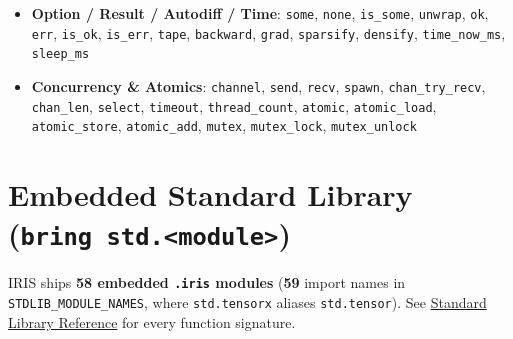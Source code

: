\documentclass[
  english,
  oneside]{book}
\newcounter{none} %
\begin{document}
\begin{itemize}
  \textbf{Collections}: \texttt{list}, \texttt{list\_get},
  \texttt{list\_set}, \texttt{list\_len}, \texttt{list\_push},
  \texttt{list\_pop}, \texttt{list\_map}, \texttt{list\_filter},
  \texttt{list\_reduce}, \texttt{list\_any}, \texttt{list\_all},
  \texttt{list\_zip}, \texttt{list\_enumerate}, \texttt{list\_flatten},
  \texttt{list\_unique}, \texttt{list\_reverse}, \texttt{list\_sorted},
  \texttt{list\_sum}, \texttt{list\_min}, \texttt{list\_max},
  \texttt{map}, \texttt{map\_get}, \texttt{map\_set},
  \texttt{map\_contains}, \texttt{map\_remove}, \texttt{map\_keys},
  \texttt{map\_values}, \texttt{map\_len}, \texttt{cell},
  \texttt{cell\_get}, \texttt{cell\_set}
\item
  \textbf{Option / Result / Autodiff / Time}: \texttt{some},
  \texttt{none}, \texttt{is\_some}, \texttt{unwrap}, \texttt{ok},
  \texttt{err}, \texttt{is\_ok}, \texttt{is\_err}, \texttt{tape},
  \texttt{backward}, \texttt{grad}, \texttt{sparsify}, \texttt{densify},
  \texttt{time\_now\_ms}, \texttt{sleep\_ms}
\item
  \textbf{Concurrency \& Atomics}: \texttt{channel}, \texttt{send},
  \texttt{recv}, \texttt{spawn}, \texttt{chan\_try\_recv},
  \texttt{chan\_len}, \texttt{select}, \texttt{timeout},
  \texttt{thread\_count}, \texttt{atomic}, \texttt{atomic\_load},
  \texttt{atomic\_store}, \texttt{atomic\_add}, \texttt{mutex},
  \texttt{mutex\_lock}, \texttt{mutex\_unlock}
\end{itemize}

\section{\texorpdfstring{Embedded Standard Library
(\texttt{bring\ std.\textless{}module\textgreater{}})}{Embedded Standard Library (bring std.\textless module\textgreater)}}\label{embedded-standard-library-bring-std.module}

IRIS ships \textbf{58 embedded \texttt{.iris} modules} (\textbf{59}
import names in \texttt{STDLIB\_MODULE\_NAMES}, where
\texttt{std.tensorx} aliases \texttt{std.tensor}). See
\href{stdlib-reference.md}{Standard Library Reference} for every
function signature.
\end{document}

